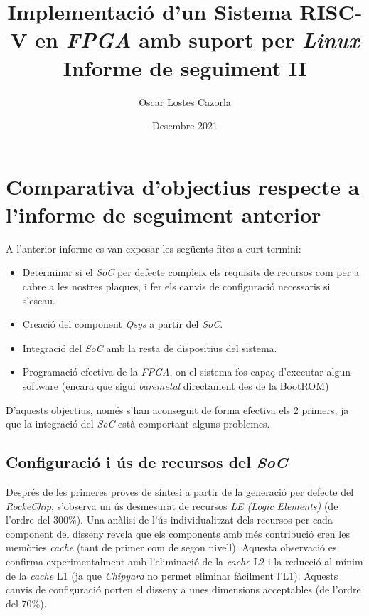 \documentclass{article}
\begin{document}
\nocite{*}

\title{\textbf{Implementació d'un Sistema RISC-V en \textit{FPGA} amb suport per \textit{Linux}} \\
Informe de seguiment II}
\author{Oscar Lostes Cazorla}
\date{Desembre 2021}

\clearpage\maketitle
\thispagestyle{empty}

\newpage

\section{Comparativa d'objectius respecte a l'informe de seguiment anterior}

A l'anterior informe es van exposar les següents fites a curt termini:
\begin{itemize}
\item Determinar si el \textit{SoC} per defecte compleix els requisits de recursos com per a cabre a les nostres plaques, i fer els canvis de configuració necessaris si s'escau.
\item Creació del component \textit{Qsys} a partir del \textit{SoC}.
\item Integració del \textit{SoC} amb la resta de dispositius del sistema.
\item Programació efectiva de la \textit{FPGA}, on el sistema fos capaç d'executar algun software (encara que sigui \textit{baremetal} directament des de la BootROM)
\end{itemize}

D'aquests objectius, només s'han aconseguit de forma efectiva els 2 primers, ja que la integració del \textit{SoC} està comportant alguns problemes.

\subsection{Configuració i ús de recursos del \textit{SoC}} \label{config}

Després de les primeres proves de síntesi a partir de la generació per defecte del \textit{RockeChip}, s'observa un ús desmesurat de recursos \textit{LE (Logic Elements)} (de l'ordre del 300\%).
Una anàlisi de l'ús individualitzat dels recursos per cada component del disseny revela que els components amb més contribució eren les memòries \textit{cache} (tant de primer com de segon nivell).
Aquesta observació es confirma experimentalment amb l'eliminació de la \textit{cache} L2 i la reducció al mínim de la \textit{cache} L1 (ja que \textit{Chipyard} no permet eliminar fàcilment l'L1). Aquests canvis de configuració porten el disseny a unes dimensions acceptables (de l'ordre del 70\%).
\\
\end{document}

